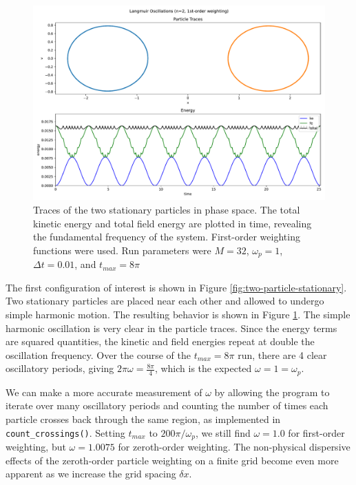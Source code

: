 \documentclass[%
 reprint,
 amsmath,amssymb,
 aps,
]{revtex4-2}
\begin{document}
\begin{figure}
\includegraphics[width=0.9\linewidth]{proj2/langmuir_stationary_trace.pdf}
\caption{\label{fig:two-particle-stationary-trace}Traces of the two stationary particles in phase space. The total kinetic energy and total field energy are plotted in time, revealing the fundamental frequency of the system. First-order weighting functions were used. Run parameters were $M=32$, $\omega_p=1$, $\Delta t = 0.01$, and $t_{max} = 8 \pi$}
\end{figure}

The first configuration of interest is shown in Figure \ref{fig:two-particle-stationary}. Two stationary particles are placed near each other and allowed to undergo simple harmonic motion. The resulting behavior is shown in Figure \ref{fig:two-particle-stationary-trace}. The simple harmonic oscillation is very clear in the particle traces. Since the energy terms are squared quantities, the kinetic and field energies repeat at double the oscillation frequency. Over the course of the $t_{max} = 8 \pi$ run, there are 4 clear oscillatory periods, giving $2 \pi \omega = \frac{8 \pi}{4}$, which is the expected $\omega = 1 = \omega_p$.

We can make a more accurate measurement of $\omega$ by allowing the program to iterate over many oscillatory periods and counting the number of times each particle crosses back through the same region, as implemented in \texttt{count\_crossings()}. Setting $t_{max}$ to $200 \pi / \omega_p$, we still find $\omega = 1.0$ for first-order weighting, but $\omega = 1.0075$ for zeroth-order weighting. The non-physical dispersive effects of the zeroth-order particle weighting on a finite grid become even more apparent as we increase the grid spacing $\delta x$.
\end{document}
